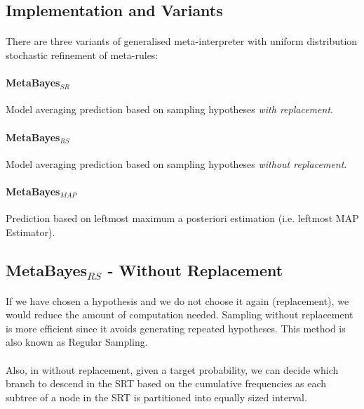 \documentclass{article}
\theoremstyle{plain}
\theoremstyle{definition}
\begin{document}
\begin{multicols}{2}
\subsection{Implementation and Variants}

\paragraph{} There are three variants of generalised meta-interpreter with uniform distribution stochastic refinement of meta-rules:

\paragraph{MetaBayes${}_{SR}$} Model averaging prediction based on sampling hypotheses \textit{with replacement}.

\paragraph{MetaBayes${}_{RS}$} Model averaging prediction based on sampling hypotheses \textit{without replacement}.

\paragraph{MetaBayes${}_{MAP}$} Prediction based on leftmost maximum a posteriori estimation (i.e. leftmost MAP Estimator).

\subsection{MetaBayes${}_{RS}$ - Without Replacement}

\paragraph{} If we have chosen a hypothesis and we do not choose it again (replacement), we would reduce the amount of computation needed. Sampling without replacement is more efficient since it avoids generating
repeated hypotheses. This method is also known as Regular Sampling.

\paragraph{} Also, in without replacement, given a target probability, we can decide which branch to descend in the SRT based on the cumulative frequencies as each subtree of a node in the SRT is partitioned into equally sized interval.

\end{multicols}



\end{document}
